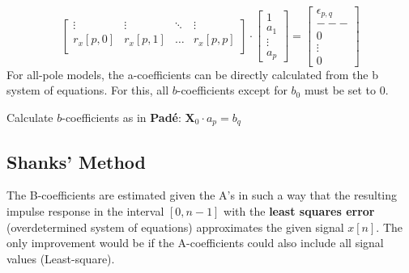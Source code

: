 \begin{aufzaehlung}
$$\begin{bmatrix}
    		\vdots & \vdots & \ddots & \vdots \\                             
    		r_x[p,0] & r_x[p,1] & \hdots & r_x[p,p] \\                        
		\end{bmatrix} \cdot 
		\begin{bmatrix}
    		1 \\
    		a_1 \\
    		\vdots \\
    		a_p
		\end{bmatrix} = \begin{bmatrix}
    		\epsilon_{p,q} \\
    		---\\
    		0 \\
    		\vdots \\
    		0
		\end{bmatrix} $$ 
		For all-pole models, the a-coefficients can be directly calculated from the b system of equations. 
		For this, all $b$-coefficients except for $b_0$ must be set to 0.
	\item Calculate $b$-coefficients as in \textbf{Padé}: $\bm X_0 \cdot a_p = b_q$
		\normalsize
\end{aufzaehlung}
	
\subsection{Shanks' Method }

The B-coefficients are estimated given the A's in such a way that the resulting impulse response in the interval $[0, n - 1]$ with the
\textbf{least squares error} (overdetermined system of equations) approximates the given
signal $x[n]$. The only improvement would be if the A-coefficients could also include all signal values (Least-square).

